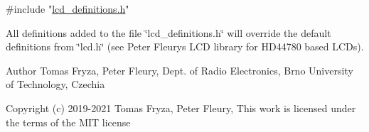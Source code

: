 \begin{DoxyCode}
\textcolor{preprocessor}{#include "\hyperlink{a00004}{lcd\_definitions.h}"} 
\end{DoxyCode}


All definitions added to the file \char`\"{}lcd\+\_\+definitions.\+h\char`\"{} will override the default definitions from \char`\"{}lcd.\+h\char`\"{} (see Peter Fleury\textquotesingle{}s L\+CD library for H\+D44780 based L\+C\+Ds).

\begin{DoxyAuthor}{Author}
Tomas Fryza, Peter Fleury, Dept. of Radio Electronics, Brno University of Technology, Czechia 
\end{DoxyAuthor}
\begin{DoxyCopyright}{Copyright}
(c) 2019-\/2021 Tomas Fryza, Peter Fleury, This work is licensed under the terms of the M\+IT license 
\end{DoxyCopyright}
